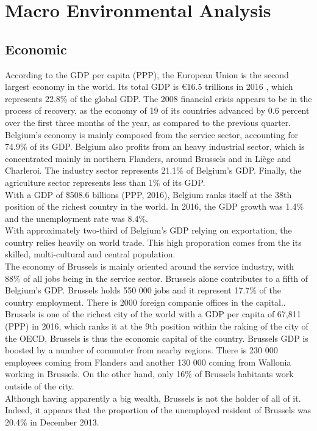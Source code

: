 \documentclass[12pt,a4paper,oneside]{book}
\begin{document}
\section{Macro Environmental Analysis}

\subsection{Economic}
According to the GDP per capita (PPP), the European Union is the second largest economy in the world. Its total GDP is \euro 16.5 trillions in 2016 , which represents 22.8\% of the global GDP\cite{imfgdp}. The 2008 financial crisis appears to be in the process of recovery, as the economy of 19 of its countries advanced by 0.6 percent over the first three months of the year, as compared to the previous quarter\cite{eurorecov}.\\

Belgium's economy is mainly composed from the service sector, accounting for 74.9\% of its GDP. Belgium also profits from an heavy industrial sector, which is concentrated mainly in northern Flanders, around Brussels and in Liège and Charleroi. The industry sector represents 21.1\% of Belgium's GDP. Finally, the agriculture sector represents less than 1\% of its GDP.\\
With a GDP of \$508.6 billions (PPP, 2016), Belgium ranks itself at the 38th position of the richest country in the world. In 2016, the GDP growth was 1.4\% and the unemployment rate was 8.4\%.\\
With approximately two-third of Belgium's GDP relying on exportation, the country relies heavily on world trade. This high proporation comes from the its skilled, multi-cultural and central population\cite{ciafb}.\\

The economy of Brussels is mainly oriented around the service industry, with 88\% of all jobs being in the service sector. Brussels alone contributes to a fifth of Belgium's GDP. Brussels holds 550 000 jobs and it represent 17.7\% of the country employment. There is 2000 foreign companie offices in the capital.\cite{bxinfo}.\\
Brussels is one of the richest city of the world with a GDP per capita of 67,811 (PPP) in 2016, which ranks it at the 9th position within the raking of the city of the OECD\cite{oecdstat}, Brussels is thus the economic capital of the country. Brussels GDP is boosted by a number of commuter from nearby regions. There is 230 000 employees coming from Flanders and another 130 000 coming from Wallonia working in Brussels. On the other hand, only 16\% of Brussels habitants work outside of the city\cite{euresCom}.\\
Although having apparently a big wealth, Brussels is not the holder of all of it. Indeed, it appears that the proportion of the unemployed resident of Brussels was 20.4\% in December 2013\cite{unemploybx}.
\end{document}

